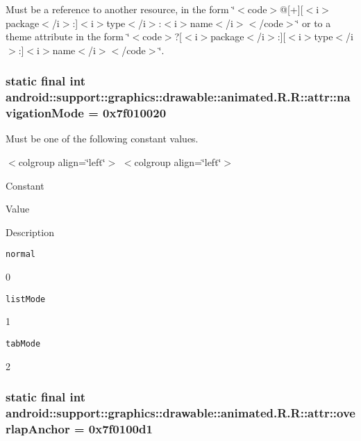 Must be a reference to another resource, in the form \char`\"{}$<$code$>$@\mbox{[}+\mbox{]}\mbox{[}$<$i$>$package$<$/i$>$:\mbox{]}$<$i$>$type$<$/i$>$:$<$i$>$name$<$/i$>$$<$/code$>$\char`\"{} or to a theme attribute in the form \char`\"{}$<$code$>$?\mbox{[}$<$i$>$package$<$/i$>$:\mbox{]}\mbox{[}$<$i$>$type$<$/i$>$:\mbox{]}$<$i$>$name$<$/i$>$$<$/code$>$\char`\"{}. \hypertarget{classandroid_1_1support_1_1graphics_1_1drawable_1_1animated_1_1_r_1_1attr_c89a67d561cc3e86127bba13945ab266}{
\subsubsection[{navigationMode}]{\setlength{\rightskip}{0pt plus 5cm}static final int android::support::graphics::drawable::animated.R.R::attr::navigationMode = 0x7f010020}}
\label{classandroid_1_1support_1_1graphics_1_1drawable_1_1animated_1_1_r_1_1attr_c89a67d561cc3e86127bba13945ab266}


Must be one of the following constant values. \begin{TabularC}{0}
\hline
\end{TabularC}
$<$colgroup align=\char`\"{}left\char`\"{}$>$ $<$colgroup align=\char`\"{}left\char`\"{}$>$ 

Constant

Value

Description 

{\tt normal}

0

{\tt listMode}

1

{\tt tabMode}

2\hypertarget{classandroid_1_1support_1_1graphics_1_1drawable_1_1animated_1_1_r_1_1attr_31d9ec365e505a37928a20e7b9117b81}{
\subsubsection[{overlapAnchor}]{\setlength{\rightskip}{0pt plus 5cm}static final int android::support::graphics::drawable::animated.R.R::attr::overlapAnchor = 0x7f0100d1}}
\label{classandroid_1_1support_1_1graphics_1_1drawable_1_1animated_1_1_r_1_1attr_31d9ec365e505a37928a20e7b9117b81}


